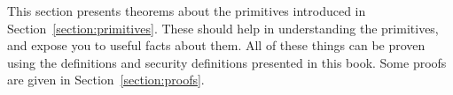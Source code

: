 This section presents theorems about the primitives introduced in Section~\ref{section:primitives}. These should help in understanding the primitives, and expose you to useful facts about them. All of these things can be proven using the definitions and security definitions presented in this book. Some proofs are given in Section~\ref{section:proofs}.